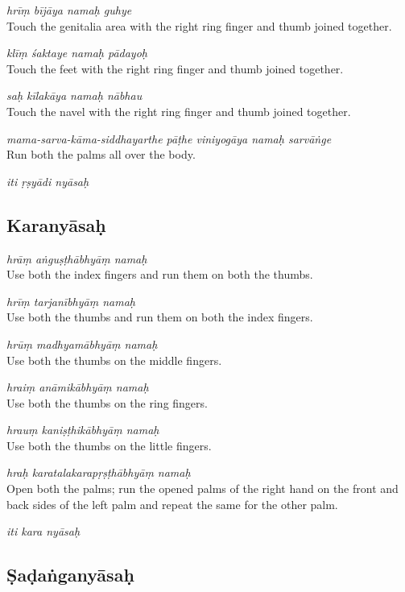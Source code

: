 \documentclass[11pt,oneside,a4paper]{article}
\newenvironment{shloka}[1]
  {\bigskip\center#1\varwidth{\linewidth}}
  {\endvarwidth\endcenter\bigskip}
\newcommand{\tl}[1]{\emph{#1}}
\begin{document}
\tl{hrīṃ bījāya namaḥ guhye}\\
Touch the genitalia area with the right ring finger and thumb joined together.

\tl{klīṃ śaktaye namaḥ pādayoḥ}\\
Touch the feet with the right ring finger and thumb joined together.

\tl{saḥ kīlakāya namaḥ nābhau}\\
Touch the navel with the right ring finger and thumb joined together.

\tl{mama-sarva-kāma-siddhayarthe pāṭhe viniyogāya namaḥ sarvāṅge}\\
Run both the palms all over the body.

\begin{shloka}\itshape
  iti ṛṣyādi nyāsaḥ
\end{shloka}

\subsection{Karanyāsaḥ}

\tl{hrāṃ aṅguṣṭhābhyāṃ namaḥ}\\
Use both the index fingers and run them on both the thumbs.

\tl{hrīṃ tarjanībhyāṃ namaḥ}\\
Use both the thumbs and run them on both the index fingers.

\tl{hrūṃ madhyamābhyāṃ namaḥ}\\
Use both the thumbs on the middle fingers.

\tl{hraiṃ anāmikābhyāṃ namaḥ}\\
Use both the thumbs on the ring fingers.

\tl{hrauṃ kaniṣṭhikābhyāṃ namaḥ}\\
Use both the thumbs on the little fingers.

\tl{hraḥ karatalakarapṛṣṭhābhyāṃ namaḥ}\\
Open both the palms; run the opened palms of the right hand on the front and
back sides of the left palm and repeat the same for the other palm.

\begin{shloka}\itshape
  iti kara nyāsaḥ
\end{shloka}

\subsection{Ṣaḍaṅganyāsaḥ}
\end{document}
